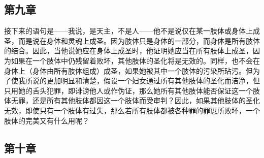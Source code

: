 \subsection{第九章}

接下来的语句是——我说，是天主，不是人——他不是说仅在某一肢体或身体上成圣，而是说在身体和灵魂上成圣。因为肢体只是身体的一部分，而身体是所有肢体的结合。因此，当他说她应在身体上成圣时，他证明她应当在所有肢体上成圣，因为如果在一个肢体中仍残留着败坏，其他肢体的圣化将是无效的。同样，也不会在身体上（身体由所有肢体组成）成圣，如果她被其中一个肢体的污染所玷污。但为了使我所说的更加明显和清楚，假设一个妇女通过所有其他肢体的圣化而洁净，但只用她的舌头犯罪，即诽谤他人或作伪证，那么她所有其他肢体能否保证这一个肢体无罪，还是所有其他肢体都因这一个肢体而受审判？因此，如果其他肢体的圣化无效，即使只有一个肢体有过失，那么若所有肢体都被各种罪的罪愆所败坏，一个肢体的完美又有什么用呢？\par


\subsection{第十章}

